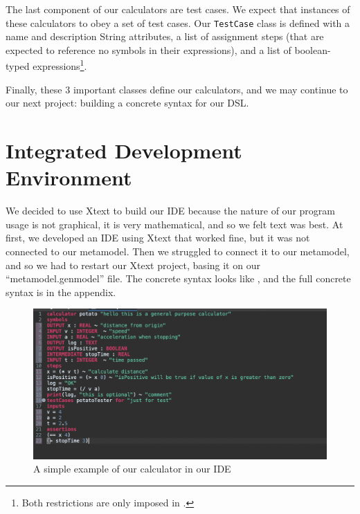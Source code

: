 \documentclass[11pt,fleqn]{article}
\begin{document}
The last component of our calculators are test cases. We expect that instances
of these calculators to obey a set of test cases. Our \lstinline{TestCase} class
is defined with a name and description String attributes, a list of assignment
steps (that are expected to reference no symbols in their expressions), and a
list of boolean-typed expressions\footnote{Both restrictions are only imposed in
.}.

Finally, these 3 important classes define our calculators, and we may continue
to our next project: building a concrete syntax for our DSL.

\newpage{}

\section{Integrated Development Environment}
\label{sec:integrated-development-environment}
We decided to use Xtext to build our IDE because the nature of our program usage
is not graphical, it is very mathematical, and so we felt text was best. At
first, we developed an IDE using Xtext that worked fine, but it was not
connected to our metamodel. Then we struggled to connect it to our metamodel,
and so we had to restart our Xtext project, basing it on our
``metamodel.genmodel'' file. The concrete syntax looks like , and
the full concrete syntax is in the appendix.

   \begin{figure}[h]
    \centering
    \includegraphics[width=1\textwidth]{ide1.png}
    \caption{A simple example of our calculator in our IDE}
    \label{fig:ide1}
\end{figure}
\end{document}
